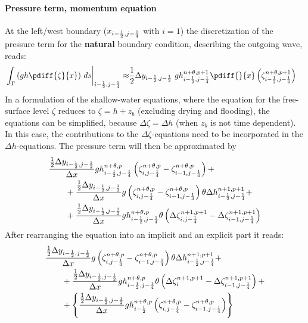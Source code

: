 \paragraph*{Pressure term, momentum equation}
At the left/west boundary ($x_{i-\frac{1}{2}, j-\frac{1}{4}}$ with $i=1$) the discretization of the pressure term for the \textbf{natural} boundary condition, describing the outgoing wave, reads:
\begin{align}
    \left. \int_\Gamma\left(gh \pdiff{\zeta}{x}\right)\, ds \right|_{i-\half, j-\quart} \approx
    & \half\Dy_{i-\half, j-\half} \ g h^{n+\theta,p+1}_{i-\half, j-\quart} \pdiff{}{x} \left( \zeta^{n+\theta,p+1}_{i-\half, j-\quart}\right)
\end{align}
In a formulation of the shallow-water equations, where the equation for the free-surface level $\zeta$ reduces to $\zeta = h + z_b$ (excluding drying and flooding), the equations can be simplified, because $\Delta \zeta = \Delta h$ (when $z_b$ is not time dependent).
In this case, the contributions to the $\Delta \zeta$-equations need to be incorporated in the $\Delta h$-equations.
The pressure term will then be approximated by
\begin{align}
    & \frac{\frac{1}{2}\Delta y_{i-\frac{1}{2}, j-\frac{1}{2}}}{\Delta x} g h^{n+\theta,p}_{i-\frac{1}{2}, j-\frac{1}{4}} \left( \zeta^{n+\theta,p}_{i, j-\frac{1}{4}} - \zeta^{n+\theta,p}_{i-1, j-\frac{1}{4}}  \right) +
    \nonumber \\*
    & \qquad + \frac{\frac{1}{2}\Delta y_{i-\frac{1}{2}, j-\frac{1}{2}}}{\Delta x}  g \left( \zeta^{n+\theta,p}_{i, j-\frac{1}{4}} - \zeta^{n+\theta,p}_{i-1, j-\frac{1}{4}} \right) \theta \Delta h^{n+1, p+1}_{i-\frac{1}{2}, j-\frac{1}{4}} +
    \nonumber \\*
    & \qquad +   \frac{\frac{1}{2}\Delta y_{i-\frac{1}{2}, j-\frac{1}{2}}}{\Delta x} g h^{n+\theta, p}_{i-\frac{1}{2}, j-\frac{1}{4}}
    \theta \left( \Delta \zeta^{n+1,p+1}_{i, j-\frac{1}{4}}  - \Delta \zeta^{n+1,p+1}_{i-1, j-\frac{1}{4}}\right)
\end{align}
After rearranging the equation into an implicit and an explicit part it reads:
\begin{align}
    & \frac{\frac{1}{2}\Delta y_{i-\frac{1}{2}, j-\frac{1}{2}}}{\Delta x}  g \left( \zeta^{n+\theta,p}_{i, j-\frac{1}{4}} - \zeta^{n+\theta,p}_{i-1, j-\frac{1}{4}} \right) \theta \Delta h^{n+1, p+1}_{i-\frac{1}{2}, j-\frac{1}{4}} +
    \\
    & \qquad +
    \frac{\frac{1}{2}\Delta y_{i-\frac{1}{2}, j-\frac{1}{2}}}{\Delta x} g h^{n+\theta, p}_{i-\frac{1}{2}, j-\frac{1}{4}}
    \theta \left( \Delta \zeta^{n+1,p+1}_{i}  - \Delta \zeta^{n+1,p+1}_{i-1, j-\frac{1}{4}}\right) +
    \nonumber \\*
    & \qquad + \left\{
    \frac{\frac{1}{2}\Delta y_{i-\frac{1}{2}, j-\frac{1}{2}}}{\Delta x} g h^{n+\theta,p}_{i-\frac{1}{2}} \left( \zeta^{n+\theta,p}_{i, j-\frac{1}{4}} - \zeta^{n+\theta,p}_{i-1, j-\frac{1}{4}}  \right)  \right\}
\end{align}
